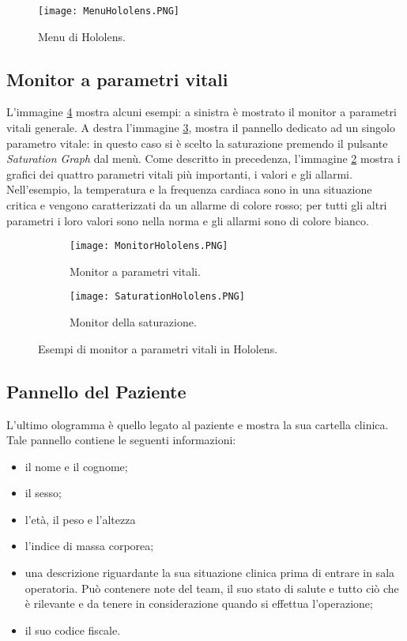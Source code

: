 \begin{figure}[ht]
    \texttt{[image: MenuHololens.PNG]}
    \centering
    \caption{\label{pic:menu-hololens}Menu di Hololens.}
\end{figure}

\subsection{Monitor a parametri vitali}
L'immagine \ref{pic:example-hololens} mostra alcuni esempi: a sinistra è mostrato il monitor a parametri vitali generale. A destra l'immagine \ref{pic:saturation-hololens}, mostra il pannello dedicato ad un singolo parametro vitale: in questo caso si è scelto la saturazione premendo il pulsante \textit{Saturation Graph} dal menù. Come descritto in precedenza, l'immagine \ref{pic:monitor-hololens} mostra i grafici dei quattro parametri vitali più importanti, i valori e gli allarmi. Nell'esempio, la temperatura e la frequenza cardiaca sono in una situazione critica e vengono caratterizzati da un allarme di colore rosso; per tutti gli altri parametri i loro valori sono nella norma e gli allarmi sono di colore bianco.

\begin{figure}
     \centering
     \begin{subfigure}[b]{0.8\textwidth}
         \centering
         \texttt{[image: MonitorHololens.PNG]}
         \caption{Monitor a parametri vitali.}
         \label{pic:monitor-hololens}
     \end{subfigure}
     \hfill
     \begin{subfigure}[b]{0.8\textwidth}
         \centering
         \texttt{[image: SaturationHololens.PNG]}
         \caption{Monitor della saturazione.}
         \label{pic:saturation-hololens}
     \end{subfigure}
     \hfill
        \caption{Esempi di monitor a parametri vitali in Hololens.}
        \label{pic:example-hololens}
\end{figure}

\subsection{Pannello del Paziente}
L'ultimo ologramma è quello legato al paziente e mostra la sua cartella clinica. Tale pannello contiene le seguenti informazioni:
\begin{itemize}
    \item il nome e il cognome;
    \item il sesso;
    \item l'età, il peso e l'altezza
    \item l'indice di massa corporea;
    \item una descrizione riguardante la sua situazione clinica prima di entrare in sala operatoria. Può contenere note del team, il suo stato di salute e tutto ciò che è rilevante e da tenere in considerazione quando si effettua l'operazione;
    \item il suo codice fiscale.
\end{itemize}